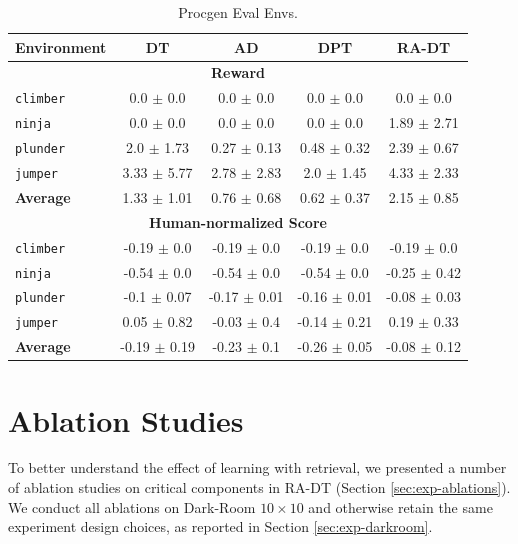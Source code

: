 \documentclass{article}
\begin{document}
\begin{table}[h]
    \centering
    \caption{Procgen Eval Envs.}
    \begin{tabular}{@{} l c c c c@{}}
    \toprule
    \textbf{Environment} & \textbf{DT} & \textbf{AD} & \textbf{DPT} & \textbf{RA-DT} \\ \midrule
    \multicolumn{5}{c}{\textbf{Reward}} \\
    \texttt{climber} & 0.0 $\pm$ 0.0 & 0.0 $\pm$ 0.0 & 0.0 $\pm$ 0.0 & 0.0 $\pm$ 0.0 \\
    \texttt{ninja} & 0.0 $\pm$ 0.0 & 0.0 $\pm$ 0.0 & 0.0 $\pm$ 0.0 & 1.89 $\pm$ 2.71 \\
    \texttt{plunder} & 2.0 $\pm$ 1.73 & 0.27 $\pm$ 0.13 & 0.48 $\pm$ 0.32 & 2.39 $\pm$ 0.67 \\
    \texttt{jumper} & 3.33 $\pm$ 5.77 & 2.78 $\pm$ 2.83 & 2.0 $\pm$ 1.45 & 4.33 $\pm$ 2.33 \\
    \textbf{Average} & 1.33 $\pm$ 1.01 & 0.76 $\pm$ 0.68 & 0.62 $\pm$ 0.37 & 2.15 $\pm$ 0.85 \\ \midrule
    \multicolumn{5}{c}{\textbf{Human-normalized Score}} \\
    \texttt{climber} & -0.19 $\pm$ 0.0 & -0.19 $\pm$ 0.0 & -0.19 $\pm$ 0.0 & -0.19 $\pm$ 0.0 \\
    \texttt{ninja} & -0.54 $\pm$ 0.0 & -0.54 $\pm$ 0.0 & -0.54 $\pm$ 0.0 & -0.25 $\pm$ 0.42 \\
    \texttt{plunder} & -0.1 $\pm$ 0.07 & -0.17 $\pm$ 0.01 & -0.16 $\pm$ 0.01 & -0.08 $\pm$ 0.03 \\
    \texttt{jumper} & 0.05 $\pm$ 0.82 & -0.03 $\pm$ 0.4 & -0.14 $\pm$ 0.21 & 0.19 $\pm$ 0.33 \\
    \textbf{Average} & -0.19 $\pm$ 0.19 & -0.23 $\pm$ 0.1 & -0.26 $\pm$ 0.05 & -0.08 $\pm$ 0.12 \\ \bottomrule
    \end{tabular}
    \label{tab:procgen-eval}
\end{table}
\section{Ablation Studies}\label{appendix:ablations}
To better understand the effect of learning with retrieval, we presented a number of ablation studies on critical components in RA-DT (Section \ref{sec:exp-ablations}).
We conduct all ablations on Dark-Room $10\times 10$ and otherwise retain the same experiment design choices, as reported in Section \ref{sec:exp-darkroom}.
\end{document}

